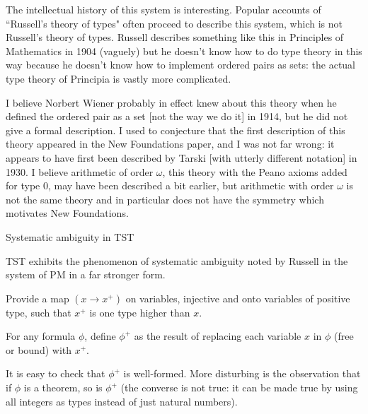 \documentclass[12pt]{slides}
\begin{document}
\begin{slide}

The intellectual history of this system is interesting.  Popular accounts of ``Russell's theory of types" often proceed to describe this system, which is not Russell's theory of types.  Russell describes something like this in Principles of Mathematics in 1904 (vaguely) but he doesn't know how to do type theory in this way because he doesn't know how to implement ordered pairs as sets:  the actual type theory of Principia is vastly more complicated.

\end{slide}

\begin{slide}

I believe Norbert Wiener probably in effect knew about this theory when he defined the ordered pair as a set [not the way we do it] in 1914, but he did not give a formal description.  I used to conjecture that the first description of this theory appeared in the New Foundations paper, and I was not far wrong:  it appears to have first been described by Tarski [with utterly different notation] in 1930.  I believe arithmetic of order $\omega$, this theory with the Peano axioms added for type 0, may have been described a bit earlier, but arithmetic with order $\omega$ is not the same theory and in particular does not have the symmetry which motivates New Foundations.

\end{slide}

\begin{slide}

{\Large Systematic ambiguity in TST}

TST exhibits the phenomenon of systematic ambiguity noted by Russell in the system of PM in a far stronger form.

Provide a map $(x \rightarrow x^+)$ on variables, injective and onto variables of positive type, such that $x^+$ is one type higher than $x$.

For any formula $\phi$, define $\phi^+$ as the result of replacing each variable $x$ in $\phi$ (free or bound) with $x^+$.

It is easy to check that $\phi^+$ is well-formed.  More disturbing is the observation that if $\phi$ is a theorem, so is $\phi^+$ (the converse is not true:  it can be made true by using all integers as types instead of just natural numbers).

\end{slide}
\end{document}
